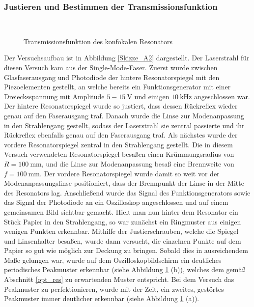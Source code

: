 \documentclass[11pt,a4paper,oneside]{scrartcl}
\begin{document}
\subsubsection{Justieren und Bestimmen der Transmissionsfunktion}
\setcounter{figure}{10}
\begin{figure}[H]
    \centering
  \\
   \caption{Transmissionsfunktion des konfokalen Resonators}
    \label{FotostreckeTransmissionsfunktion}
\end{figure}
Der Versuchsaufbau ist in Abbildung \ref{Skizze_A2} dargestellt. Der Laserstrahl für diesen Versuch kam aus der Single-Mode-Faser. Zuerst wurde zwischen Glasfaserausgang und Photodiode der 
hintere Resonatorspiegel mit den Piezoelementen gestellt, an welche bereits ein Funktionsgenerator mit einer Dreiecksspannung mit Amplitude $5-15\ \mathrm V$ und einigen $10\ \mathrm{kHz}$ angeschlossen war. Der hintere Resonatorspiegel wurde so justiert, dass dessen 
Rückreflex wieder genau auf den Faserausgang traf. Danach wurde die Linse zur Modenanpassung in den Strahlengang gestellt, sodass der Laserstrahl sie zentral passierte und ihr Rückreflex ebenfalls
genau auf den Faserausgang traf. Als nächstes wurde der vordere Resonatorspiegel zentral in den Strahlengang gestellt. Die in diesem Versuch verwendeten Resonatorspiegel besaßen einen Krümmungsradius von 
$R=100\ \mathrm{mm}$, und die Linse zur Modenanpassung besaß eine Brennweite von $f=100\ \mathrm{mm}$. Der vordere Resonatorspiegel wurde damit so weit vor der Modenanpassungslinse positioniert, dass der Brennpunkt der Linse in der Mitte des
Resonators lag. Anschließend wurde das Signal des Funktionsgenerators sowie das Signal der Photodiode an ein Oszilloskop angeschlossen und auf einem gemeinsamen Bild sichtbar gemacht. Hielt man nun hinter dem
Resonator ein Stück Papier in den Strahlengang, so war zunächst ein Ringmuster aus einigen wenigen Punkten erkennbar. Mithilfe der Justierschrauben, welche die Spiegel und Linsenhalter besaßen, wurde dann versucht, die einzelnen 
Punkte auf dem Papier so gut wie möglich zur Deckung zu bringen. Sobald dies in ausreichendem Maße gelungen war, wurde auf dem Oszilloskopbildschirm ein deutliches periodisches Peakmuster erkennbar (siehe
Abbildung \ref{FotostreckeTransmissionsfunktion} (b)), welches dem gemäß Abschnitt \ref{opt_res} zu erwartenden Muster entspricht. Bei dem Versuch das Peakmuster zu perfektionieren, wurde mit der Zeit, ein zweites, gestörtes Peakmuster immer
deutlicher erkennbar (siehe Abbildung \ref{FotostreckeTransmissionsfunktion} (a)). 
\end{document}
